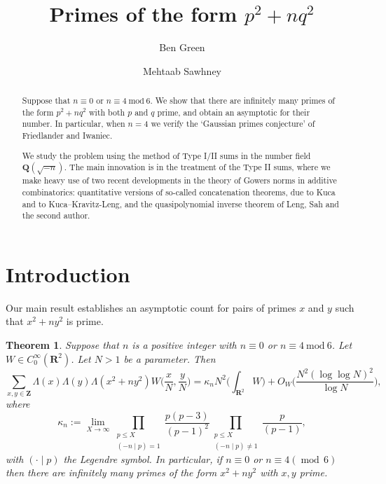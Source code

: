\documentclass[11pt,reqno]{amsart}
\title{Primes of the form $p^2 + nq^2$}
\author[A1]{Ben Green}
\author[A2]{Mehtaab Sawhney}
\numberwithin{equation}{section}
\newtheorem{theorem}{Theorem}[section]
\theoremstyle{definition}
\theoremstyle{remark}
\newcommand{\imod}[1]{~\mathrm{mod}~#1}
\renewcommand{\le}{\leqslant}
\newcommand\Z{\mathbf{Z}}
\newcommand\Q{\mathbf{Q}}
\newcommand\R{\mathbf{R}}
\newcommand{\legendre}[2]{(#1 \mid #2)}
\newcommand{\md}[1]{\ensuremath{(\operatorname{mod}\, #1)}}
\begin{document}
\begin{abstract}
Suppose that $n \equiv 0$ or $n \equiv 4 \imod{6}$. We show that there are infinitely many primes of the form $p^2 + nq^2$ with both $p$ and $q$ prime, and obtain an asymptotic for their number. In particular, when $n = 4$ we verify the `Gaussian primes conjecture' of Friedlander and Iwaniec.

We study the problem using the method of Type I/II sums in the number field $\Q(\sqrt{-n})$. The main innovation is in the treatment of the Type II sums, where we make heavy use of two recent developments in the theory of Gowers norms in additive combinatorics: quantitative versions of so-called concatenation theorems, due to Kuca and to Kuca--Kravitz-Leng, and the quasipolynomial inverse theorem of Leng, Sah and the second author.
\end{abstract}

\maketitle

\setcounter{tocdepth}{1}
\tableofcontents

\section{Introduction}\label{sec:introduction}

 Our main result establishes an asymptotic count for pairs of primes $x$ and $y$ such that $x^2 + ny^2$ is prime. 

\begin{theorem}\label{thm:main}
Suppose that $n$ is a positive integer with $n \equiv 0$ or $n\equiv 4\imod 6$. Let $W \in C^{\infty}_0(\R^2)$. Let $N > 1$ be a parameter. Then
\[ \sum_{x,y \in \Z} \Lambda(x) \Lambda(y) \Lambda(x^2 + ny^2) W\bigg(\frac{x}{N}, \frac{y}{N}\bigg) = \kappa_n N^2 \bigg(\int_{\R^2} W\bigg) + O_W\bigg( \frac{N^2(\log \log N)^{2}}{\log N}\bigg),\]
where
\begin{equation}\label{kappa-def}
\kappa_n :=   \lim_{X \rightarrow \infty} \prod_{\substack{p \le X \\ \legendre{-n}{p} = 1}}\frac{p(p-3)}{(p-1)^2}\prod_{\substack{p \le X \\ \legendre{-n}{p} \neq 1}}\frac{p}{(p-1)},\end{equation}
with $\legendre{\cdot}{p}$ the Legendre symbol. In particular, if $n \equiv 0$ or $n \equiv 4 \md{6}$ then there are infinitely many primes of the form $x^2 + ny^2$ with $x, y$ prime.
\end{theorem}
\end{document}
